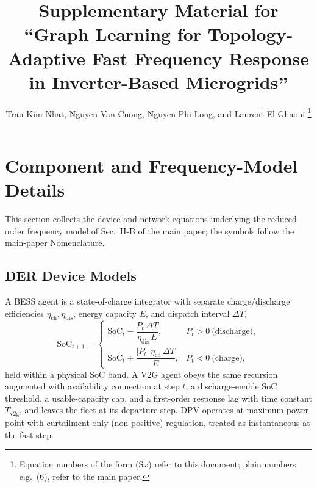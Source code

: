 \documentclass[lettersize,journal]{IEEEtran}
\begin{document}
\title{Supplementary Material for ``Graph Learning for Topology-Adaptive Fast Frequency Response in Inverter-Based Microgrids''}

\author{Tran Kim Nhat, Nguyen Van Cuong, Nguyen Phi Long, and Laurent El Ghaoui%
\thanks{Equation numbers of the form (S$x$) refer to this document; plain numbers, e.g.\ (6), refer to the main paper.}}

\maketitle

\section{Component and Frequency-Model Details}
\label{supp:models}
This section collects the device and network equations underlying the reduced-order frequency model of Sec.~II-B of the main paper; the symbols follow the main-paper Nomenclature.

\subsection{DER Device Models}
A BESS agent is a state-of-charge integrator with separate charge/discharge efficiencies $\eta_{\mathrm{ch}},\eta_{\mathrm{dis}}$, energy capacity $E$, and dispatch interval $\Delta T$,
\begin{equation}
  \mathrm{SoC}_{t+1}=
  \begin{cases}
    \mathrm{SoC}_t-\dfrac{P_t\,\Delta T}{\eta_{\mathrm{dis}}\,E},
      & P_t>0\ \text{(discharge)},\\[6pt]
    \mathrm{SoC}_t+\dfrac{|P_t|\,\eta_{\mathrm{ch}}\,\Delta T}{E},
      & P_t<0\ \text{(charge)},
  \end{cases}
  \label{eq:bess_soc}
\end{equation}
held within a physical SoC band. A V2G agent obeys the same recursion augmented with availability connection at step $t$, a discharge-enable SoC threshold, a usable-capacity cap, and a first-order response lag with time constant $T_{\mathrm{v2g}}$, and leaves the fleet at its departure step. DPV operates at maximum power point with curtailment-only (non-positive) regulation, treated as instantaneous at the fast step.
\end{document}
